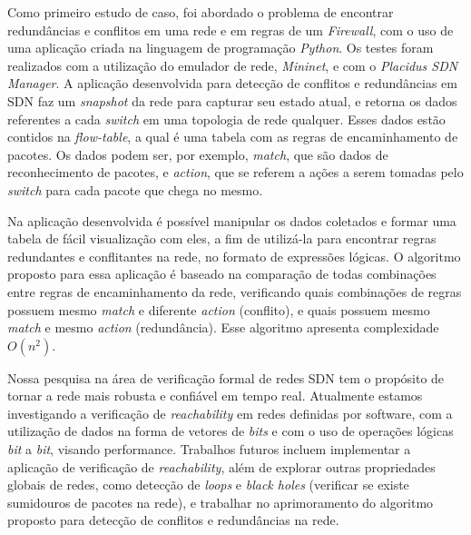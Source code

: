 \documentclass[a4paper,12pt,twoside]{article}
\begin{document}
Como primeiro estudo de caso, foi abordado o problema de encontrar redundâncias e conflitos em uma rede e em regras de um \textit{Firewall}, com o uso de uma aplicação criada na linguagem de programação \textit{Python}.
Os testes foram realizados com a utilização do emulador de rede, \textit{Mininet}, e com o \textit{Placidus SDN Manager}.
A aplicação desenvolvida para detecção de conflitos e redundâncias em SDN faz um \textit{snapshot} da rede para capturar seu estado atual, e retorna os dados referentes a cada \textit{switch} em uma topologia de rede qualquer.
Esses dados estão contidos na \textit{flow-table}, a qual é uma tabela com as regras de encaminhamento de pacotes.
Os dados podem ser, por exemplo, \textit{match}, que são dados de reconhecimento de pacotes, e \textit{action}, que se referem a ações a serem tomadas pelo \textit{switch} para cada pacote que chega no mesmo. 


Na aplicação desenvolvida é possível manipular os dados coletados e formar uma tabela de fácil visualização com eles, a fim de utilizá-la para encontrar regras redundantes e conflitantes na rede, no formato de expressões lógicas. 
O algoritmo proposto para essa aplicação é baseado na comparação de todas combinações entre regras de encaminhamento da rede, verificando quais combinações de regras possuem mesmo \textit{match} e diferente \textit{action} (conflito), e quais possuem mesmo \textit{match} e mesmo \textit{action} (redundância).
Esse algoritmo apresenta complexidade $O(n^{2})$. 


Nossa pesquisa na área de verificação formal de redes SDN tem o propósito de tornar a rede mais robusta e confiável em tempo real.
Atualmente estamos investigando a verificação de \textit{reachability} em redes definidas por software, com a utilização de dados na forma de vetores de \textit{bits} e com o uso de operações lógicas \textit{bit} a \textit{bit}, visando performance.
Trabalhos futuros incluem implementar a aplicação de verificação de \textit{reachability}, além de explorar outras propriedades globais de redes, como detecção de \textit{loops} e \textit{black holes} (verificar se existe sumidouros de pacotes na rede), e trabalhar no aprimoramento do algoritmo proposto para detecção de conflitos e redundâncias na rede.
\end{document}
